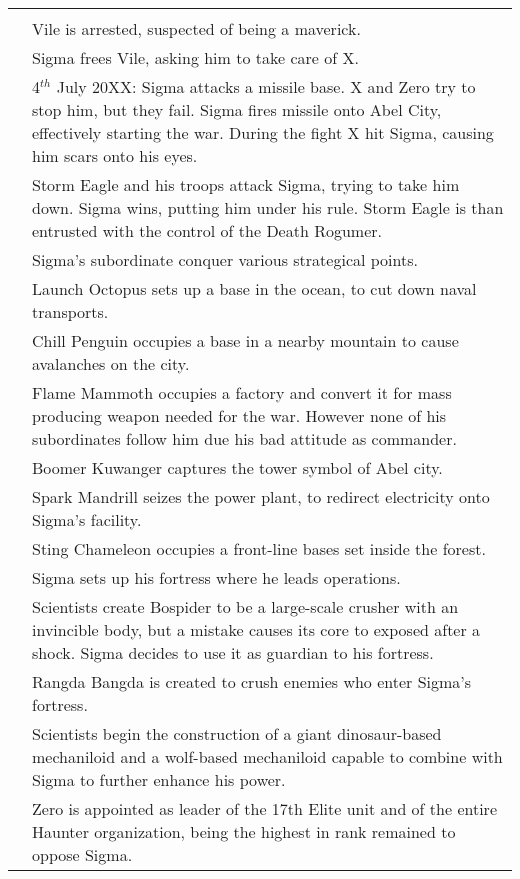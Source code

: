 \begin{tabularx}{\linewidth}{l X}
	\midrule
	\rowcolor{Aquamarine}
	\multicolumn{2}{c}{\textbf{Day of $\Sigma$ and beginning of the war}}\\
	\addlinespace[1.5ex]
	\tabdot& Vile is arrested, suspected of being a maverick.\\
	\tabdot& Sigma frees Vile, asking him to take care of X.\\
	\tabdot& 4$^{th}$ July 20XX: Sigma attacks a missile base. X and Zero try to stop him, but they fail. Sigma fires missile onto Abel City, effectively starting the war. During the fight X hit Sigma, causing him scars onto his eyes.\\
	\tabdot& Storm Eagle and his troops attack Sigma, trying to take him down. Sigma wins, putting him under his rule. Storm Eagle is than entrusted with the control of the Death Rogumer.\\
	\tabdot& Sigma's subordinate conquer various strategical points.\\
	\tabline& Launch Octopus sets up a base in the ocean, to cut down naval transports.\\
	\tabline& Chill Penguin occupies a base in a nearby mountain to cause avalanches on the city.\\
	\tabline& Flame Mammoth occupies a factory and convert it for mass producing weapon needed for the war. However none of his subordinates follow him due his bad attitude as commander.\\
	\tabline& Boomer Kuwanger captures the tower symbol of Abel city.\\
	\tabline& Spark Mandrill seizes the power plant, to redirect electricity onto Sigma's facility.\\
	\tabline& Sting Chameleon occupies a front-line bases set inside the forest.\\
	\tabdot& Sigma sets up his fortress where he leads operations.\\
	\tabline& Scientists create Bospider to be a large-scale crusher with an invincible body, but a mistake causes its core to exposed after a shock. Sigma decides to use it as guardian to his fortress.\\
	\tabline& Rangda Bangda is created to crush enemies who enter Sigma's fortress.\\
	\tabline& Scientists begin the construction of a giant dinosaur-based mechaniloid and a wolf-based mechaniloid capable to combine with Sigma to further enhance his power.\\
	\tabdot& Zero is appointed as leader of the 17th Elite unit and of the entire Haunter organization, being the highest in rank remained to oppose Sigma.\\

\end{tabularx}
